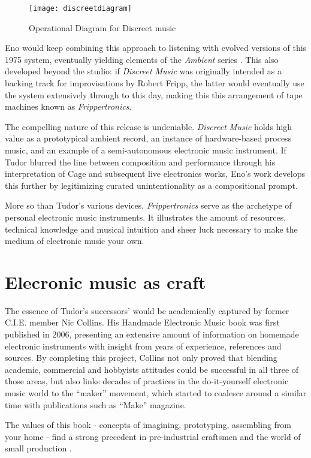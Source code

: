 \begin{figure}[h!]
  \caption{Operational Diagram for Discreet music}
  \centering
    \texttt{[image: discreetdiagram]}
\end{figure}

Eno would keep combining this approach to listening with evolved versions of this 1975 system, eventually yielding elements of the \emph{Ambient} series \cite{eno1978,eno1980,eno1980b,eno1982}. This also developed beyond the studio: if \emph{Discreet Music} was originally intended as a backing track for improvisations by Robert Fripp, the latter would eventually use the system extensively through to this day, making this this arrangement of tape machines known as \emph{Frippertronics}. 

The compelling nature of this release is undeniable. \emph{Discreet Music } holds high value as a prototypical ambient record, an instance of hardware-based process music, and an example of a semi-autonomous electronic music instrument. If Tudor blurred the line between composition and performance through his interpretation of Cage and subsequent live electronics works, Eno's work develops this further by legitimizing curated unintentionality as a compositional prompt. 

More so than Tudor's various devices, \emph{Frippertronics} serve as the archetype of personal electronic music instruments. It illustrates the amount of resources, technical knowledge and musical intuition and sheer luck necessary to make the medium of electronic music your own. 

\section{Elecronic music as craft} 

	The essence of Tudor’s successors’ would be academically captured by 
former C.I.E. member Nic Collins. His Handmade Electronic Music book was first published in 2006, presenting an extensive amount of information on homemade electronic instruments with insight from years of experience, references and sources. By completing this project, Collins not only proved that blending academic, commercial and hobbyists attitudes could be successful in all three of those areas, but also links decades of practices in the do-it-yourself electronic music world to the “maker” movement, which started to coalesce around a similar time with publications such as “Make” magazine.

	The values of this book - concepts of imagining, prototyping, assembling from your home - find a strong precedent in pre-industrial craftsmen and the world of small production \cite{collins2006,ghazala2005,kuivila2004}. 

